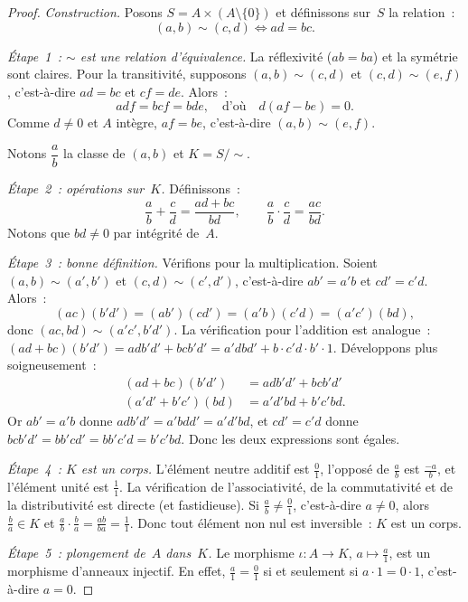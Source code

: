 \documentclass[12pt,a4paper,openany]{book}
\theoremstyle{definition}
\begin{document}
\begin{proof}
\emph{Construction.} Posons $S = A \times (A \setminus \{0\})$ et
définissons sur~$S$ la relation~:
\[
  (a,b) \sim (c,d) \iff ad = bc.
\]

\emph{\'Etape~1~: $\sim$ est une relation d'équivalence.}
La réflexivité ($ab = ba$) et la symétrie sont claires. Pour la
transitivité, supposons $(a,b) \sim (c,d)$ et $(c,d) \sim (e,f)$,
c'est-à-dire $ad = bc$ et $cf = de$. Alors~:
\[
  adf = bcf = bde, \quad\text{d'où}\quad d(af - be) = 0.
\]
Comme $d \neq 0$ et $A$ intègre, $af = be$, c'est-à-dire
$(a,b) \sim (e,f)$.

Notons $\dfrac{a}{b}$ la classe de $(a,b)$ et $K = S/{\sim}$.

\emph{\'Etape~2~: opérations sur~$K$.} Définissons~:
\[
  \frac{a}{b} + \frac{c}{d} = \frac{ad + bc}{bd}, \qquad
  \frac{a}{b} \cdot \frac{c}{d} = \frac{ac}{bd}.
\]
Notons que $bd \neq 0$ par intégrité de~$A$.

\emph{\'Etape~3~: bonne définition.}
Vérifions pour la multiplication. Soient $(a,b) \sim (a',b')$ et
$(c,d) \sim (c',d')$, c'est-à-dire $ab' = a'b$ et $cd' = c'd$.
Alors~:
\[
  (ac)(b'd') = (ab')(cd') = (a'b)(c'd) = (a'c')(bd),
\]
donc $(ac, bd) \sim (a'c', b'd')$. La vérification pour l'addition
est analogue~: $(ad + bc)(b'd') = adb'd' + bcb'd'
= a'dbd' + b \cdot c'd \cdot b' \cdot 1$. Développons plus
soigneusement~:
\begin{align*}
  (ad + bc)(b'd') &= adb'd' + bcb'd' \\
  (a'd' + b'c')(bd) &= a'd'bd + b'c'bd.
\end{align*}
Or $ab' = a'b$ donne $adb'd' = a'bdd' = a'd'bd$, et $cd' = c'd$
donne $bcb'd' = bb'cd' = bb'c'd = b'c'bd$. Donc les deux expressions
sont égales.

\emph{\'Etape~4~: $K$ est un corps.}
L'élément neutre additif est $\frac{0}{1}$, l'opposé de $\frac{a}{b}$
est $\frac{-a}{b}$, et l'élément unité est $\frac{1}{1}$. La
vérification de l'associativité, de la commutativité et de la
distributivité est directe (et fastidieuse). Si $\frac{a}{b} \neq
\frac{0}{1}$, c'est-à-dire $a \neq 0$, alors $\frac{b}{a} \in K$ et
$\frac{a}{b} \cdot \frac{b}{a} = \frac{ab}{ba} = \frac{1}{1}$. Donc
tout élément non nul est inversible~: $K$ est un corps.

\emph{\'Etape~5~: plongement de~$A$ dans~$K$.}
Le morphisme $\iota \colon A \to K$, $a \mapsto \frac{a}{1}$, est
un morphisme d'anneaux injectif. En effet, $\frac{a}{1} = \frac{0}{1}$
si et seulement si $a \cdot 1 = 0 \cdot 1$, c'est-à-dire $a = 0$.
\end{proof}
\end{document}
